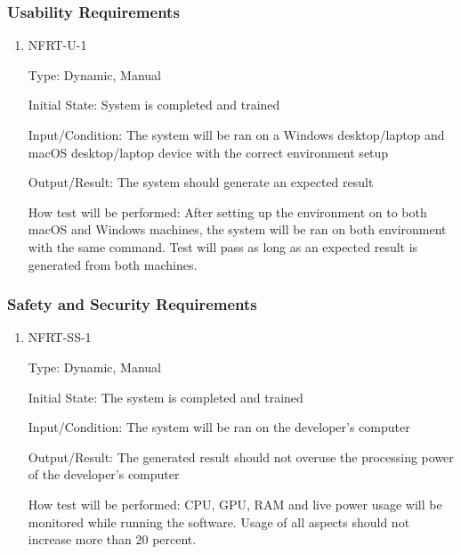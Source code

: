 \documentclass[12pt, titlepage]{article}
\begin{document}
\subsubsection{Usability Requirements}
		

\begin{enumerate}

\item{NFRT-U-1\\}

Type: Dynamic, Manual
					
Initial State: System is completed and trained
					
Input/Condition: The system will be ran on a Windows desktop/laptop and macOS desktop/laptop device with the correct environment setup
					
Output/Result: The system should generate an expected result 
					
How test will be performed: After setting up the environment on to both macOS and Windows machines, the system will be ran on both environment with the same command. Test will pass as long as an expected result is generated from both machines.


\end{enumerate}


\subsubsection{Safety and Security Requirements}


\begin{enumerate}

\item{NFRT-SS-1\\}

Type: Dynamic, Manual
					
Initial State: The system is completed and trained 
					
Input/Condition: The system will be ran on the developer's computer
					
Output/Result: The generated result should not overuse the processing power of the developer's computer
					
How test will be performed: CPU, GPU, RAM and live power usage will be monitored while running the software. Usage of all aspects should not increase more than 20 percent.   
					
\end{enumerate}
\end{document}
